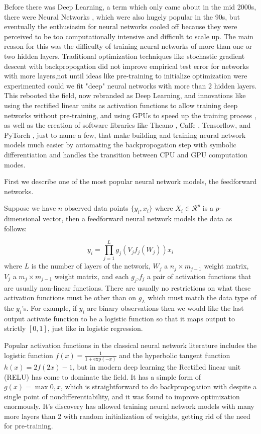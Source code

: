 \documentclass[12pt]{report}
\begin{document}
Before there was Deep Learning, a term which only came about in the mid 2000s, there were Neural Networks \cite{bishop1995neural,ripley2007pattern}, which were also hugely popular in the 90s, but eventually the enthusiasim for neural networks cooled off because they were perceived to be too computationally intensive and difficult to scale up. The main reason for this was the difficulty of training neural networks of more than one or two hidden layers. Traditional optimization techniques like stochastic gradient descent with backpropogation did not improve empirical test error for networks with more layers,not until ideas like pre-training to initialize optimization were experimented could we fit "deep" neural networks with more than 2 hidden layers. This rebooted the field, now rebranded as Deep Learning, and innovations like using the rectified linear units as activation functions \cite{nair2010rectified} to allow training deep networks without pre-training, and using GPUs to speed up the training process \cite{krizhevsky2012imagenet}, as well as the creation of software libraries like Theano \cite{bergstra2010theano}, Caffe \cite{jia2014caffe}, Tensorflow\cite{tensorflow2015-whitepaper}, and PyTorch \cite{paszke2017automatic}, just to name a few, that make building and training neural network models much easier by automating the backpropogation step with symbolic differentiation \cite{bahrampour2015comparative} and handles the transition between CPU and GPU computation modes. 

First we describe one of the most popular neural network models, the feedforward networks.

Suppose we have $n$ observed data points $\{y_i,x_i\}$ where $X_i \in
\mathcal{R}^p$ is a $p$-dimensional vector, then a feedforward neural network models the
data as follows:

\[y_i = \prod_{j=1}^Lg_j(V_jf_j(W_j))x_i \]
where $L$ is the number of layers of the network, $W_j$ a $n_j \times m_{j-1}$
weight matrix, $V_j$ a $m_j \times m_{j-1}$ weight matrix, and each $g_j$,$f_j$
a pair of activation functions that are usually non-linear functions. There are
usually no restrictions on what these activation functions must be other than on
$g_L$ which must match the data type of the $y_i$'s. For example, if $y_i$ are
binary observations then we would like the last output activate function to be a
logistic function so that it maps output to strictly $[0,1]$, just like in
logistic regression.

Popular activation functions in the classical neural network literature includes
the logistic function $f(x) = \frac{1}{1+\text{exp}(-x)} $ and the hyperbolic tangent function $h(x) =  2f(2x)-1$, but in modern deep
learning the Rectified linear unit (RELU) has come to dominate the field. It has
a simple form of $g(x)=\max{0,x}$, which is straightforward to do
backpropogation with despite a single point of nondifferentiability, and it was
found to improve optimization enormously. It's discovery has allowed training
neural network models with many more layers than 2 with random initialization of
weights, getting rid of the need for pre-training. 
\end{document}
